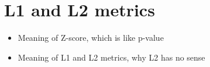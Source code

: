 \section{L1 and L2 metrics}

\begin{itemize}
    \item Meaning of Z-score, which is like p-value
    \item Meaning of L1 and L2 metrics, why L2 has no sense
\end{itemize}